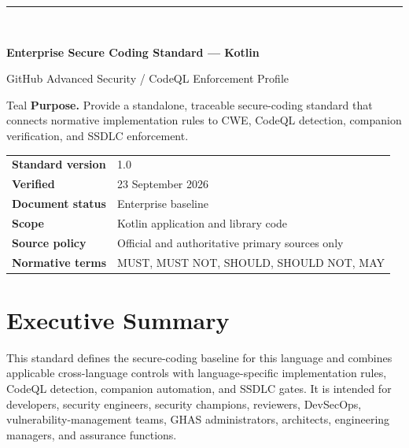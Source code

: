 \documentclass[10pt,letterpaper]{article}
\begin{document}
\fancyhead[L]{\textcolor{Muted}{Enterprise Secure Coding Standard --- Kotlin}}
\fancyhead[R]{\textcolor{Muted}{v1.0 --- 23 September 2026}}
\hypersetup{pageanchor=false}
\begin{titlepage}
\thispagestyle{empty}
\vspace*{0.85in}
{\color{Teal}\rule{1.2in}{3pt}}\\[0.32in]
{\Huge\bfseries\color{Navy}Enterprise Secure Coding Standard --- Kotlin\par}
\vspace{0.18in}
{\Large\color{Teal}GitHub Advanced Security / CodeQL Enforcement Profile\par}
\vspace{0.55in}
\begin{callout}{Teal}
\textbf{Purpose.} Provide a standalone, traceable secure-coding standard that connects normative implementation rules to CWE, CodeQL detection, companion verification, and SSDLC enforcement.
\end{callout}
\vfill
\begin{tabular}{@{}ll@{}}
\textbf{Standard version} & 1.0 \\
\textbf{Verified} & 23 September 2026 \\
\textbf{Document status} & Enterprise baseline \\
\textbf{Scope} & Kotlin application and library code \\
\textbf{Source policy} & Official and authoritative primary sources only \\
\textbf{Normative terms} & MUST, MUST NOT, SHOULD, SHOULD NOT, MAY \\
\end{tabular}
\vspace{0.55in}
\end{titlepage}
\hypersetup{pageanchor=true}
\tableofcontents
\clearpage
{}

\section{Executive Summary}
This standard defines the secure-coding baseline for this language and combines applicable cross-language controls with language-specific implementation rules, CodeQL detection, companion automation, and SSDLC gates. It is intended for developers, security engineers, security champions, reviewers, DevSecOps, vulnerability-management teams, GHAS administrators, architects, engineering managers, and assurance functions.
\end{document}
